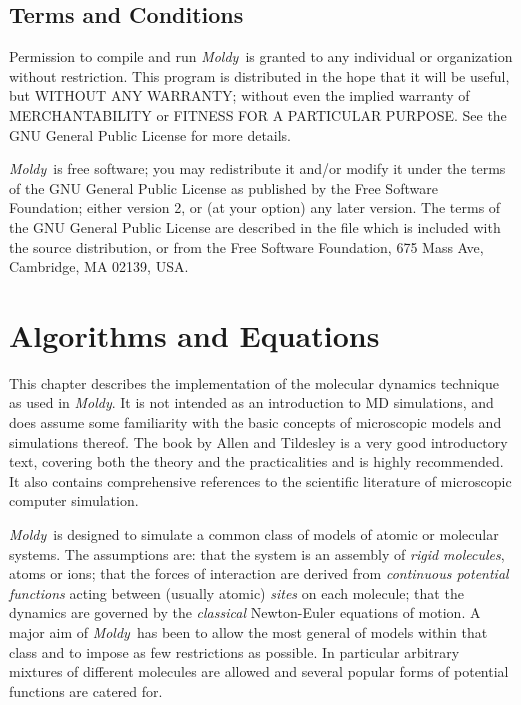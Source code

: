 \documentclass[a4paper,twoside]{report}
\newcommand{\moldy}{\emph{Moldy}}
\begin{document}
\section{Terms and Conditions}%

Permission to compile and run \moldy\ is granted to any individual or
organization without restriction.  This program is distributed in the
hope that it will be useful, but WITHOUT ANY WARRANTY; without even
the implied warranty of MERCHANTABILITY or FITNESS FOR A PARTICULAR
PURPOSE\@.  See the GNU General Public License for more details.

\moldy\ is free software; you may redistribute it and/or modify it
under the terms of the GNU General Public License as published by the
Free Software Foundation; either version 2, or (at your option) any
later version.  The terms of the GNU General Public License are
described in the file  which is included with the
source distribution, or from the Free Software Foundation, 675 Mass
Ave, Cambridge, MA 02139, USA.

\chapter{Algorithms and Equations}  %

This chapter  describes the implementation  of the  molecular dynamics
technique as used in \moldy.  It is not intended as an introduction to
MD  simulations, and  does assume some    familiarity  with the  basic
concepts of microscopic models  and simulations thereof.  The book  by
Allen and Tildesley\cite{allen:87}  is a  very good    introductory text,
covering   both the  theory  and  the  practicalities and  is   highly
recommended.  It   also  contains   comprehensive  references  to  the
scientific literature of microscopic computer simulation.

\moldy\  is designed to simulate a common class of models of atomic or
molecular systems. The assumptions are: that the system is an assembly
of  \emph{rigid   molecules},  atoms   or  ions;  that  the  forces  of
interaction are derived   from \emph{continuous  potential  functions}
acting between (usually atomic) \emph{sites} on each molecule; that the
dynamics are governed by the \emph{classical} Newton-Euler equations of
motion.  A major aim of \moldy\ has been to allow the most  general of
models within that class and to impose as few restrictions as possible.
In particular arbitrary mixtures of different molecules are allowed
and several popular forms of potential functions are catered for.
\end{document}
